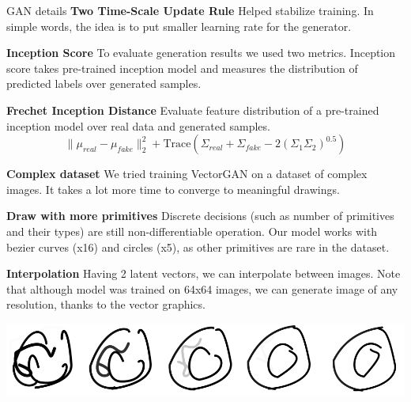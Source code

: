 \documentclass{beamer}
\newcommand{\paragraph}[1]{\noindent\textbf{#1}\quad}
\begin{document}
\begin{frame}[fragile]
\begin{columns}[T]
\begin{column}{.33\textwidth}
\begin{block}{GAN details}
	\paragraph{Two Time-Scale Update Rule} Helped stabilize training. In simple words, the idea is to put smaller learning rate for the generator.
	
	\paragraph{Inception Score} To evaluate generation results we used two metrics. Inception score takes pre-trained inception model and measures the distribution of predicted labels over generated samples.
	
	\paragraph{Frechet Inception Distance} Evaluate feature distribution of a pre-trained inception model over real data and generated samples.
	$$\| \mu_{real} - \mu_{fake} \|_2^2 + \text{Trace}(\Sigma_{real} + \Sigma_{fake} - 2 (\Sigma_1 \Sigma_2)^{0.5})$$
	
	\paragraph{Complex dataset} We tried training VectorGAN on a dataset of complex images. It takes a lot more time to converge to meaningful drawings.
	
	\paragraph{Draw with more primitives} Discrete decisions (such as number of primitives and their types) are still non-differentiable operation. Our model works with bezier curves (x16) and circles (x5), as other primitives are rare in the dataset.
	
	\paragraph{Interpolation} Having 2 latent vectors, we can interpolate between images. Note that although model was trained on 64x64 images, we can generate image of any resolution, thanks to the vector graphics.
	\begin{center}
		\includegraphics[width=0.7\linewidth]{images/inter1.png}
	\end{center}
	

\end{block}
\end{column}
\end{columns}
\end{frame}
\end{document}
